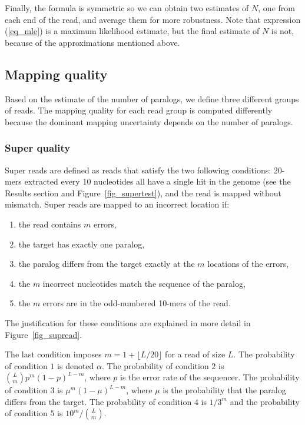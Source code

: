 \documentclass[a4,center,fleqn]{NAR}
\begin{document}
Finally, the formula is symmetric so we can obtain two estimates of $N$,
one from each end of the read, and average them for more robustness. Note
that expression (\ref{eq_mle}) is a maximum likelihood estimate, but the
final estimate of $N$ is not, because of the approximations mentioned
above.

\subsection{Mapping quality}

Based on the estimate of the number of paralogs, we define three
different groups of reads. The mapping quality for each read group
is computed differently because the dominant mapping uncertainty
depends on the number of paralogs.

\subsubsection{Super quality} Super reads are defined as reads that
satisfy the two following conditions: 20-mers extracted every 10
nucleotides all have a single hit in the genome (see the Results section
and Figure~\ref{fig_supertest}), and the read is mapped without mismatch.
Super reads are mapped to an incorrect location if:
\begin{enumerate}
  \item the read contains $m$ errors,
  \item the target has exactly one paralog,
  \item the paralog differs from the target exactly at the $m$ locations
    of the errors,
  \item the $m$ incorrect nucleotides match the sequence of the paralog,
  \item the $m$ errors are in the odd-numbered 10-mers of the read.
\end{enumerate}
The justification for these conditions are explained in more detail in
Figure~\ref{fig_supread}.

The last condition imposes $m = 1 + \lfloor L/20 \rfloor$ for a read of
size $L$. The probability of condition $1$ is denoted $\alpha$. The
probability of condition $2$ is ${L \choose m}p^m(1-p)^{L-m}$, where $p$
is the error rate of the sequencer. The probability of condition $3$
is $\mu^m(1-\mu)^{L-m}$, where $\mu$ is the probability that the paralog
differs from the target. The probability of condition $4$ is $1/3^m$ and
the probability of condition $5$ is $10^m/{L\choose m}$.
\end{document}
